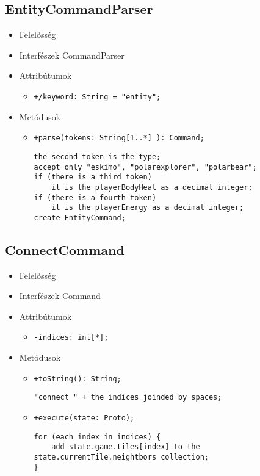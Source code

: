 \subsection{EntityCommandParser}
\begin{itemize}
\item Felelősség\newline
\item Interfészek\newline
CommandParser
\item Attribútumok
	\begin{itemize}
		\item \texttt{+/keyword: String = "entity";}
	\end{itemize}
\item Metódusok
\begin{itemize}
		\item \texttt{+parse(tokens: String[1..*] ): Command;}
		\begin{lstlisting}
the second token is the type;
accept only "eskimo", "polarexplorer", "polarbear";
if (there is a third token)
	it is the playerBodyHeat as a decimal integer;
if (there is a fourth token)
	it is the playerEnergy as a decimal integer;
create EntityCommand;
		\end{lstlisting}
	\end{itemize}
\end{itemize}

\subsection{ConnectCommand}
\begin{itemize}
\item Felelősség\newline
\item Interfészek\newline
Command
\item Attribútumok
	\begin{itemize}
		\item \texttt{-indices: int[*];}
	\end{itemize}
\item Metódusok
\begin{itemize}
		\item \texttt{+toString(): String;}
		\begin{lstlisting}
"connect " + the indices joinded by spaces;
		\end{lstlisting}
		\item \texttt{+execute(state: Proto);}
		\begin{lstlisting}
for (each index in indices) {
	add state.game.tiles[index] to the state.currentTile.neightbors collection;
}
		\end{lstlisting}
	\end{itemize}
\end{itemize}
